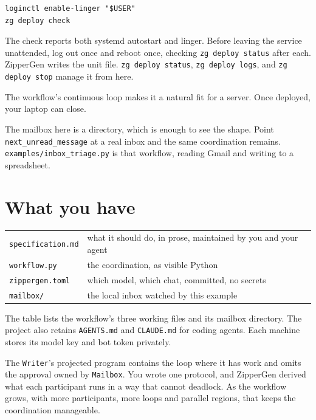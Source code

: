 \documentclass[11pt,a4paper]{article}
\begin{document}
\begin{lstlisting}[style=shell]
loginctl enable-linger "$USER"
zg deploy check
\end{lstlisting}

The check reports both systemd autostart and linger. Before leaving the service
unattended, log out once and reboot once, checking \texttt{zg deploy status}
after each. ZipperGen writes the unit file. \texttt{zg deploy status},
\texttt{zg deploy logs}, and \texttt{zg deploy stop} manage it from here.

The workflow's continuous loop makes it a natural fit for a server. Once
deployed, your laptop can close.

The mailbox here is a directory, which is enough to see the shape. Point
\texttt{next\_unread\_message} at a real inbox and the same coordination remains.
\texttt{examples/inbox\_triage.py} is that workflow, reading Gmail and writing
to a spreadsheet.

\section{What you have}

\enlargethispage{2\baselineskip}

\begin{center}
\begin{tabularx}{0.94\linewidth}{@{}lX@{}}
\toprule
\texttt{specification.md} & what it should do, in prose, maintained by you and your agent \\
\texttt{workflow.py} & the coordination, as visible Python \\
\texttt{zippergen.toml} & which model, which chat, committed, no secrets \\
\texttt{mailbox/} & the local inbox watched by this example \\
\bottomrule
\end{tabularx}
\end{center}

The table lists the workflow's three working files and its mailbox directory.
The project also retains \texttt{AGENTS.md} and \texttt{CLAUDE.md} for coding
agents. Each machine stores its model key and bot token privately.

The \texttt{Writer}'s projected program contains the loop where it has work and
omits the approval owned by
\texttt{Mailbox}. You wrote one protocol, and ZipperGen derived what each
participant runs in a way that cannot deadlock. As the workflow grows, with
more participants, more loops and parallel regions, that keeps the coordination
manageable.
\end{document}
